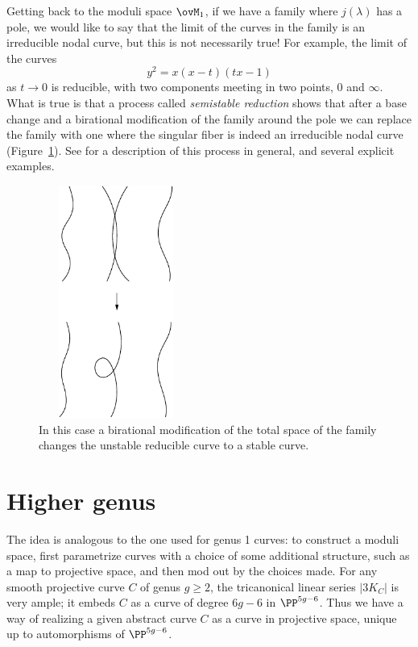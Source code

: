 Getting back to the moduli space $\ovM_1$, if we have a family where
$j(\lambda)$ has a pole, we would like to say that the limit of the curves in the family is an irreducible nodal curve,
but this is not necessarily true! For example, the limit of the curves
$$
y^2 = x(x-t)(tx-1)
$$
as $t \to 0$ is reducible, with two components meeting in two points, 0 and $\infty$.
What is true is that a process called
\emph{semistable reduction}
%
shows that after a base change and a birational
modification of the family around the pole we can replace the family with one where the singular fiber
is indeed an irreducible nodal curve
(Figure~\ref{unstable to stable}).
See \cite{MR1631825} for a description of this process in
general, and several explicit examples.

\begin{figure}
\centerline{\includegraphics[width=2in,height=3in]{"main/Fig07-1"}}
\caption{In this case a birational modification of the 
total space of the family changes the unstable reducible curve to a stable curve.}
\label{unstable to stable}
\end{figure}

\section{Higher genus}

The  idea  is  analogous to the one used  for genus 1 curves: to
construct a moduli space, first parametrize curves with a choice of
some additional structure, such as a map to projective space, and then
mod out by the choices made. For any smooth projective curve $C$ of
genus $g\geq 2$, the tricanonical linear series
%
%
$|3K_C|$ is very
ample; it embeds $C$ as a curve of degree $6g-6$ in $\PP^{5g-6}$. Thus
we have a way of realizing a given abstract curve $C$ as a curve in
projective space, unique up to automorphisms of $\PP^{5g-6}$.

